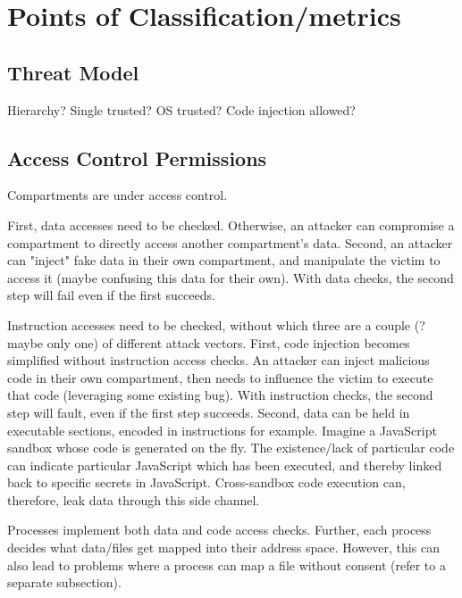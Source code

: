 \section{Points of Classification/metrics}

\subsection{Threat Model}
Hierarchy?
Single trusted?
OS trusted?
Code injection allowed?

\subsection{Access Control Permissions}

Compartments are under access control. 

First, data accesses need to be checked. 
Otherwise, an attacker can compromise a compartment to directly access another
compartment's data.
Second, an attacker can "inject" fake data in their own compartment, and 
manipulate the victim to access it (maybe confusing this data for their own).
With data checks, the second step will fail even if the first succeeds.

Instruction accesses need to be checked, without which three are a 
couple (? maybe only one) of different attack vectors.
First, code injection becomes simplified without instruction access checks.
An attacker can inject malicious code in their own compartment, then needs
to influence the victim to execute that code (leveraging some existing bug).
With instruction checks, the second step will fault, even if the first step
succeeds.
Second, data can be held in executable sections, encoded in instructions for example.
Imagine a JavaScript sandbox whose code is generated on the fly. 
The existence/lack of particular code can indicate particular JavaScript which has
been executed, and thereby linked back to specific secrets in JavaScript.
Cross-sandbox code execution can, therefore, leak data through this side channel.

Processes implement both data and code access checks. 
Further, each process decides what data/files get mapped into their address space.
However, this can also lead to problems where a process can map a file without
consent (refer to a separate subsection).

